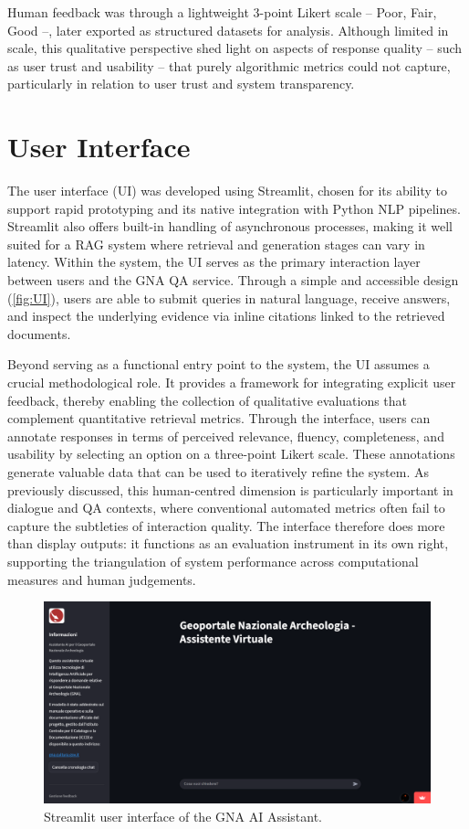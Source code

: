 \begin{spacing}{1.5}
Human feedback was through a lightweight 3-point Likert scale -- Poor, Fair, Good --, later exported as structured datasets for analysis. Although limited in scale, this qualitative perspective shed light on aspects of response quality -- such as user trust and usability -- that purely algorithmic metrics could not capture, particularly in relation to user trust and system transparency.


\section{User Interface}
The user interface (UI) was developed using Streamlit, chosen for its ability to support rapid prototyping and its native integration with Python NLP pipelines. Streamlit also offers built-in handling of asynchronous processes, making it well suited for a RAG system where retrieval and generation stages can vary in latency. Within the system, the UI serves as the primary interaction layer between users and the GNA QA service. Through a simple and accessible design (\autoref{fig:UI}), users are able to submit queries in natural language, receive answers, and inspect the underlying evidence via inline citations linked to the retrieved documents.

Beyond serving as a functional entry point to the system, the UI assumes a crucial methodological role. It provides a framework for integrating explicit user feedback, thereby enabling the collection of qualitative evaluations that complement quantitative retrieval metrics. Through the interface, users can annotate responses in terms of perceived relevance, fluency, completeness, and usability by selecting an option on a three-point Likert scale. These annotations generate valuable data that can be used to iteratively refine the system. As previously discussed, this human-centred dimension is particularly important in dialogue and QA contexts, where conventional automated metrics often fail to capture the subtleties of interaction quality. The interface therefore does more than display outputs: it functions as an evaluation instrument in its own right, supporting the triangulation of system performance across computational measures and human judgements.

\vspace{0.8em}
\begin{figure}[H]
  \centering
  \includegraphics[width=\textwidth]{images/UI_full.png} 
  \caption{Streamlit user interface of the GNA AI Assistant.}
  \label{fig:UI}
\end{figure}


\end{spacing}
